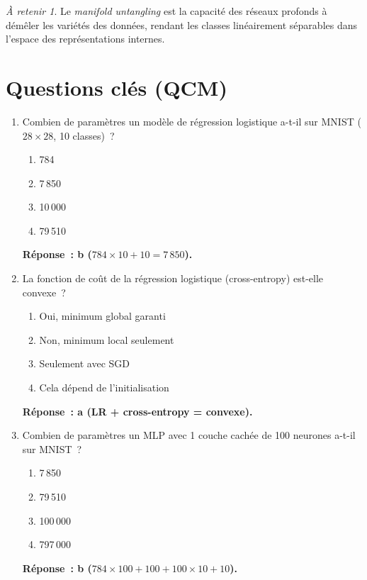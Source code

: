 \documentclass[a4paper,11pt]{article}
\theoremstyle{definition}
\theoremstyle{remark}
\newtheorem*{important}{\`A retenir}
\begin{document}
\begin{important}
  Le \emph{manifold untangling} est la capacit\'e des r\'eseaux
  profonds \`a \guillemotleft{}d\'em\^eler\guillemotright{} les
  vari\'et\'es des donn\'ees, rendant les classes lin\'eairement
  s\'eparables dans l'espace des repr\'esentations internes.
\end{important}

\newpage
\section*{Questions cl\'es (QCM)}

\begin{enumerate}
  \item Combien de param\`etres un mod\`ele de r\'egression
    logistique a-t-il sur MNIST ($28\times28$, 10 classes)~?
    \begin{enumerate}
      \item 784
      \item 7\,850
      \item 10\,000
      \item 79\,510
    \end{enumerate}
    \textbf{R\'eponse~: b ($784\times10 + 10 = 7\,850$).}

  \item La fonction de co\^ut de la r\'egression logistique
    (cross-entropy) est-elle convexe~?
    \begin{enumerate}
      \item Oui, minimum global garanti
      \item Non, minimum local seulement
      \item Seulement avec SGD
      \item Cela d\'epend de l'initialisation
    \end{enumerate}
    \textbf{R\'eponse~: a (LR + cross-entropy = convexe).}

  \item Combien de param\`etres un MLP avec 1 couche cach\'ee
    de 100 neurones a-t-il sur MNIST~?
    \begin{enumerate}
      \item 7\,850
      \item 79\,510
      \item 100\,000
      \item 797\,000
    \end{enumerate}
    \textbf{R\'eponse~: b ($784\times100{+}100{+}100\times10{+}10$).}


\end{enumerate}
\end{document}
